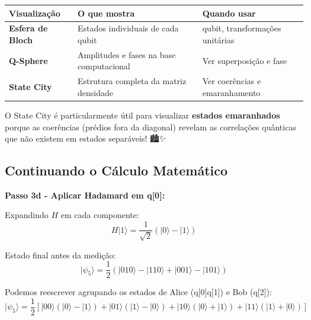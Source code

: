 \documentclass[
  brazilian,
]{report}
\newcounter{none} %
\begin{document}
{\def\LTcaptype{none} %
\begin{longtable}[]{@{}
  >{\raggedright\arraybackslash}p{}
  >{\raggedright\arraybackslash}p{}
  >{\raggedright\arraybackslash}p{}@{}}
\toprule\noalign{}
\begin{minipage}[b]{\linewidth}\raggedright
Visualização
\end{minipage} & \begin{minipage}[b]{\linewidth}\raggedright
O que mostra
\end{minipage} & \begin{minipage}[b]{\linewidth}\raggedright
Quando usar
\end{minipage} \\
\midrule\noalign{}
\endhead
\bottomrule\noalign{}
\endlastfoot
\textbf{Esfera de Bloch} & Estados individuais de cada qubit & 1 qubit,
transformações unitárias \\
\textbf{Q-Sphere} & Amplitudes e fases na base computacional & Ver
superposição e fase \\
\textbf{State City} & Estrutura completa da matriz densidade & Ver
coerências e emaranhamento \\
\end{longtable}
}

O State City é particularmente útil para visualizar \textbf{estados
emaranhados} porque as coerências (prédios fora da diagonal) revelam as
correlações quânticas que não existem em estados separáveis! 🏙️✨

\subsection{Continuando o Cálculo
Matemático}\label{continuando-o-cuxe1lculo-matemuxe1tico-1}

\textbf{Passo 3d - Aplicar Hadamard em q{[}0{]}:}

Expandindo \(H\) em cada componente:
\[H|1\rangle = \frac{1}{\sqrt{2}}(|0\rangle - |1\rangle)\]

Estado final antes da medição:
\[|\psi_5\rangle = \frac{1}{2}(|010\rangle - |110\rangle + |001\rangle - |101\rangle)\]

Podemos reescrever agrupando os estados de Alice (q{[}0{]}q{[}1{]}) e
Bob (q{[}2{]}):
\[|\psi_5\rangle = \frac{1}{2}[|00\rangle(|0\rangle - |1\rangle) + |01\rangle(|1\rangle - |0\rangle) + |10\rangle(|0\rangle + |1\rangle) + |11\rangle(|1\rangle + |0\rangle)]\]
\end{document}
